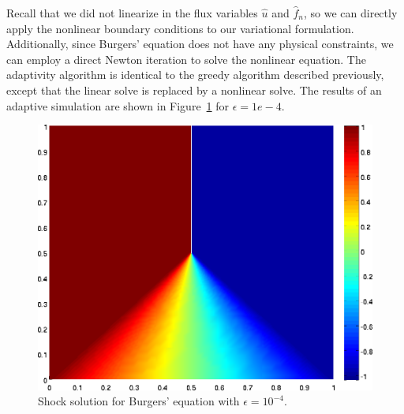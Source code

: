 Recall that we did not linearize in the flux variables $\widehat{u}$ and $\widehat{f}_n$, so we can directly apply the nonlinear boundary conditions to our variational formulation.  Additionally, since Burgers' equation does not have any physical constraints, we can employ a direct Newton iteration to solve the nonlinear equation.  The adaptivity algorithm is identical to the greedy algorithm described previously, except that the linear solve is replaced by a nonlinear solve.  The results of an adaptive simulation are shown in Figure~\ref{fig:BurgersShock} for $\epsilon = 1e-4$.  

\begin{figure}[!h]
\centering
\includegraphics[scale=.45]{figs/burgers1e4.png}
\caption{Shock solution for Burgers' equation with $\epsilon = 10^{-4}$.} 
\label{fig:BurgersShock}
\end{figure}

